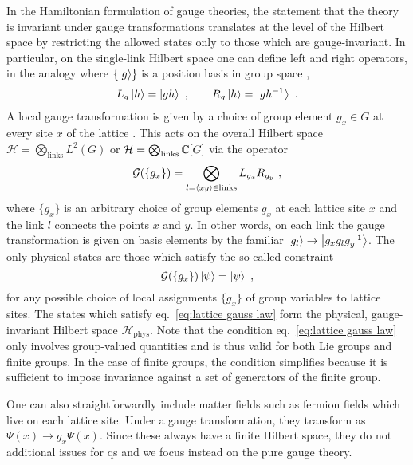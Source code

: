 In the Hamiltonian formulation of gauge theories, the statement that the theory is invariant under gauge transformations translates at the level of the Hilbert space by restricting the allowed states only to those which are gauge-invariant.
In particular, on the single-link Hilbert space one can define left and right  operators, in the analogy where $\{\ket{g}\}$ is a position basis in group space \cite{ZoharBurrello},
\begin{equation}
    \label{eq:regular representations}
    L_g \ket{h} = \ket{gh} \ , \quad \quad R_g \ket{h} = \ket{gh^{-1}} \ .
\end{equation}
A local gauge transformation is given by a choice of group element $g_x \in G$ at every site $x$ of the lattice \cite{milstead2018qyangmills}.
This acts on the overall Hilbert space $\mathcal{H} = \bigotimes_{\mathrm{links}} L^2(G)$ or $\mathcal{H} = \bigotimes_{\mathrm{links}} \mathbb{C}[G]$ via the operator
\begin{equation}
    \label{eq:gauss law operator}
    \mathcal{G}(\{g_x\}) = \bigotimes_{l=\expval{xy} \in \mathrm{links}} L_{g_{x}} R_{g_y} \ ,
\end{equation}
where $\{g_x\}$ is an arbitrary choice of group elements $g_x$ at each lattice site $x$ and the link $l$ connects the points $x$ and $y$.
In other words, on each link the gauge transformation is given on basis elements by the familiar $\ket{g_l} \to \ket{g_x g_l g_y^{-1}}$.
The only physical states are those which satisfy the so-called  constraint \cite{kogut2975hamiltonian, milstead2018qyangmills, tong2018gauge}
\begin{equation}
    \label{eq:lattice gauss law}
    \mathcal{G}(\{g_x\}) \ket{\psi}=\ket{\psi} \ ,
\end{equation}
for any possible choice of local assignments $\{g_x\}$ of group variables to lattice sites.
The states which satisfy eq.~\eqref{eq:lattice gauss law} form the physical, gauge-invariant Hilbert space $\mathcal{H}_\mathrm{phys}$.
Note that the condition eq.~\eqref{eq:lattice gauss law} only involves group-valued quantities and is thus valid for both Lie groups and finite groups.
In the case of finite groups, the condition simplifies because it is sufficient to impose invariance against a set of generators of the finite group.

One can also straightforwardly include matter fields such as fermion fields which live on each lattice site.
Under a gauge transformation, they transform as $\Psi(x) \to g_x \Psi(x)$.
Since these always have a finite Hilbert space, they do not additional issues for \ac{qs} and we focus instead on the pure gauge theory.

